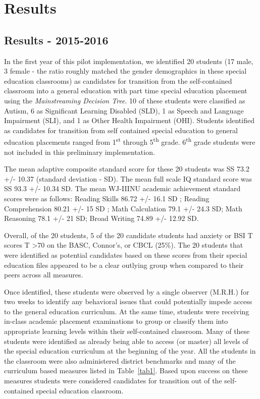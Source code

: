 \documentclass[twoside]{article}
\begin{document}
\section{Results}
\subsection{Results - 2015-2016}
In the first year of this pilot implementation, we identified 20 students (17 male, 3 female - the ratio roughly matched the gender demographics in these special education classrooms) as candidates for transition from the self-contained classroom into a general education with part time special education placement using the \textit{Mainstreaming Decision Tree}. 10 of these students were classified as Autism, 6 as Significant Learning Disabled (SLD), 1 as Speech and Language Impairment (SLI), and 1 as Other Health Impairment (OHI). Students identified as candidates for transition from self contained special education to general education placements ranged from 1\textsuperscript{st} through 5\textsuperscript{th} grade. 6\textsuperscript{th} grade students were not included in this preliminary implementation.

The mean adaptive composite standard score for these 20 students was SS 73.2 +/- 10.37 (standard deviation - SD). The mean full scale IQ standard score was SS 93.3 +/- 10.34 SD. The mean WJ-IIINU academic achievement standard scores were as follows: Reading Skills 86.72 +/- 16.1 SD ; Reading Comprehension 80.21 +/- 15 SD ; Math Calculation 79.1 +/- 24.3 SD; Math Reasoning 78.1 +/- 21 SD; Broad Writing 74.89 +/- 12.92 SD.

Overall, of the 20 students, 5 of the 20 candidate students had anxiety or BSI T scores T \textgreater70 on the BASC, Connor's, or CBCL (25\%). The 20 students that were identified as potential candidates based on these scores from their special education files appeared to be a clear outlying group when compared to their peers across all measures.

Once identified, these students were observed by a single observer (M.R.H.) for two weeks to identify any behavioral issues that could potentially impede access to the general education curriculum. At the same time, students were receiving in-class academic placement examinations to group or classify them into appropriate learning levels within their self-contained classroom. Many of these students were identified as already being able to access (or master) all levels of the special education curriculum at the beginning of the year. All the students in the classroom were also administered district benchmarks and many of the curriculum based measures listed in Table~\ref{tab1}. Based upon success on these measures students were considered candidates for transition out of the self-contained special education classroom.
\end{document}
